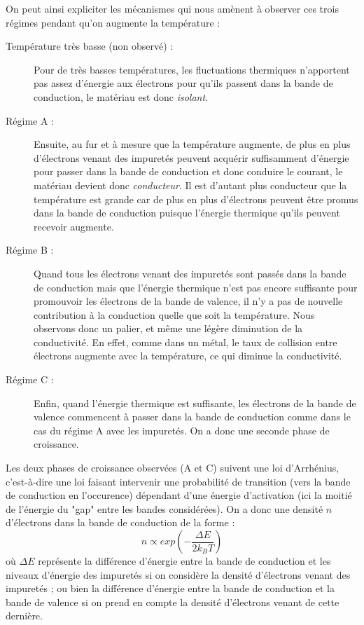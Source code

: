 On peut ainsi expliciter les mécanismes qui nous amènent à observer ces trois régimes pendant qu'on augmente la température : 
\begin{description}
\item[Température très basse (non observé) : ] Pour de très basses températures, les fluctuations thermiques n'apportent pas assez d'énergie aux électrons pour qu'ils passent dans la bande de conduction, le matériau est donc \emph{isolant}.
\item[Régime A : ] Ensuite, au fur et à mesure que la température augmente, de plus en plus d'électrons venant des impuretés peuvent acquérir suffisamment d'énergie pour passer dans la bande de conduction et donc conduire le courant, le matériau devient donc \emph{conducteur}. Il est d'autant plus conducteur que la température est grande car de plus en plus d'électrons peuvent être promus dans la bande de conduction puisque l'énergie thermique qu'ils peuvent recevoir augmente.
\item[Régime B : ] Quand tous les électrons venant des impuretés sont passés dans la bande de conduction mais que l'énergie thermique n'est pas encore suffisante pour promouvoir les électrons de la bande de valence, il n'y a pas de nouvelle contribution à la conduction quelle que soit la température. Nous observons donc un palier, et même une légère diminution de la conductivité. En effet, comme dans un métal, le taux de collision entre électrons augmente avec la température, ce qui diminue la conductivité.
\item[Régime C : ] Enfin, quand l'énergie thermique est suffisante, les électrons de la bande de valence commencent à passer dans la bande de conduction comme dans le cas du régime A avec les impuretés. On a donc une seconde phase de croissance.
\end{description}

Les deux phases de croissance observées (A et C) suivent une loi d'Arrhénius, c'est-à-dire une loi faisant intervenir une probabilité de transition (vers la bande de conduction en l'occurence) dépendant d'une énergie d'activation (ici la moitié de l'énergie du "gap" entre les bandes considérées). On a donc une densité $n$ d'électrons dans la bande de conduction de la forme : 
\begin{equation}
	n \propto exp \left( - \frac{\Delta E}{2 k_{B} T} \right)
\end{equation}
où $\Delta E$ représente la différence d'énergie entre la bande de conduction et les niveaux d'énergie des impuretés si on considère la densité d'électrons venant des impuretés ; ou bien la différence d'énergie entre la bande de conduction et la bande de valence si on prend en compte la densité d'électrons venant de cette dernière.

